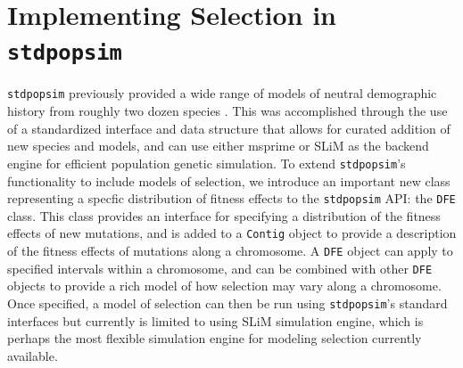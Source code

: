 \documentclass[hidelinks]{article}
\newcommand{\stdpopsim}{\texttt{stdpopsim}\xspace}
\begin{document}
\section*{Implementing Selection in \stdpopsim}
    \label{selection}

    \stdpopsim previously provided a wide range of models of neutral
    demographic history from roughly two dozen species \citep{lauterbur2023expanding}.
    This was accomplished through the use of a standardized interface
    and data structure that allows for curated addition of new
    species and models, and can use either
    msprime \citep{Baumdicker2022} or SLiM \citep{haller2019slim}
    as the backend engine for efficient population genetic simulation.
    To extend \stdpopsim's functionality to include models of selection, 
    we introduce an important new class representing a specfic distribution of fitness effects
    to the \stdpopsim API: the \texttt{DFE} class. 
    This class provides an interface for specifying
    a distribution of the fitness effects of new mutations, and
    is added to a \texttt{Contig} object to provide a description
    of the fitness effects of mutations along a chromosome.
    A \texttt{DFE} object can apply to specified intervals within a chromosome,
    and can be combined with other \texttt{DFE} objects to provide 
    a rich model of how selection may vary along a chromosome. 
    Once specified, a model of selection can then be run using \stdpopsim's standard interfaces
    but currently is limited to using SLiM simulation engine, which
    is perhaps the most flexible simulation engine for modeling selection currently available.
    
\end{document}
